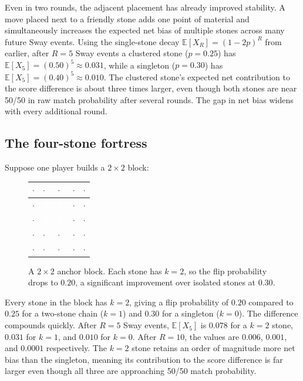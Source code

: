 Even in two rounds, the adjacent placement has already improved stability.
A move placed next to a friendly stone adds one point of material and simultaneously increases the expected net bias of multiple stones across many future Sway events.
Using the single-stone decay $\mathbb{E}[X_R] = (1-2p)^R$ from earlier, after $R = 5$ Sway events a clustered stone ($p = 0.25$) has $\mathbb{E}[X_5] = (0.50)^5 \approx 0.031$, while a singleton ($p = 0.30$) has $\mathbb{E}[X_5] = (0.40)^5 \approx 0.010$.
The clustered stone's expected net contribution to the score difference is about three times larger, even though both stones are near 50/50 in raw match probability after several rounds. The gap in net bias widens with every additional round.

\subsection{The four-stone fortress}

Suppose one player builds a $2 \times 2$ block:

\begin{figure}[ht]
\centering
\begin{tabular}{|w{c}{1.2em}|w{c}{1.2em}|w{c}{1.2em}|w{c}{1.2em}|w{c}{1.2em}|}
\hline
$\cdot$ & $\cdot$ & $\cdot$ & $\cdot$ & $\cdot$ \\
\hline
$\cdot$ & \textcolor{white}{\textbf{B}} & \textcolor{white}{\textbf{B}} & $\cdot$ & $\cdot$ \\
\hline
$\cdot$ & \textcolor{white}{\textbf{B}} & \textcolor{white}{\textbf{B}} & $\cdot$ & $\cdot$ \\
\hline
$\cdot$ & $\cdot$ & $\cdot$ & $\cdot$ & $\cdot$ \\
\hline
$\cdot$ & $\cdot$ & $\cdot$ & $\cdot$ & $\cdot$ \\
\hline
\end{tabular}
\caption{A $2 \times 2$ anchor block. Each stone has $k = 2$, so the flip probability drops to $0.20$, a significant improvement over isolated stones at $0.30$.}
\label{fig:anchor-block}
\end{figure}

Every stone in the block has $k = 2$, giving a flip probability of $0.20$ compared to $0.25$ for a two-stone chain ($k = 1$) and $0.30$ for a singleton ($k = 0$).
The difference compounds quickly.
After $R = 5$ Sway events, $\mathbb{E}[X_5]$ is $0.078$ for a $k = 2$ stone, $0.031$ for $k = 1$, and $0.010$ for $k = 0$.
After $R = 10$, the values are $0.006$, $0.001$, and $0.0001$ respectively.
The $k = 2$ stone retains an order of magnitude more net bias than the singleton, meaning its contribution to the score difference is far larger even though all three are approaching 50/50 match probability.

